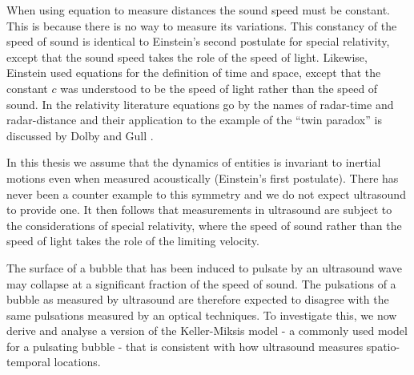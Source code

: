 
When using equation  to measure distances the sound speed must be constant.
This is because there is no way to measure its variations.
This constancy of the speed of sound is identical to Einstein's  second postulate for special relativity\cite{Einstein1905},
except that the sound speed takes the role of the speed of light.
Likewise, Einstein used equations  for the definition of time and space, 
except that  the  constant $c$ was understood to be the speed of light rather than the speed of sound.
In the relativity literature equations  go by the names of radar-time 
and radar-distance and their application to the example of the ``twin paradox'' is discussed by Dolby and Gull  \cite{Dolby2001}.

In this thesis we  assume that the dynamics of entities is invariant to inertial motions even when measured acoustically (Einstein's first postulate).
There has never been a counter example to this symmetry and we do not expect ultrasound to provide one.
It then follows that measurements in ultrasound are subject to the considerations of special relativity,
where the speed of sound rather than the speed of light takes the role of the limiting velocity.

The surface of a  bubble that has been induced to pulsate by an ultrasound wave may collapse at a significant fraction of the speed of sound\cite{Neppiras1980}.
The pulsations of a bubble as measured by ultrasound are therefore expected to disagree with the same pulsations measured by an optical techniques.
To investigate this, we now derive and analyse a version of the Keller-Miksis model\cite{Keller1980} 
- a commonly used model for a pulsating bubble - that is consistent with how ultrasound measures spatio-temporal locations.



